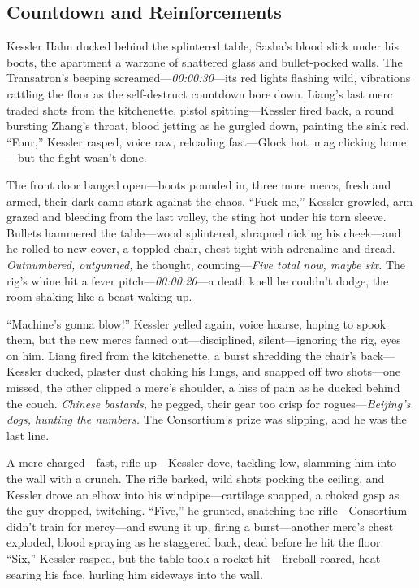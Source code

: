 \documentclass[12pt]{book}
\begin{document}
\subsection{Countdown and Reinforcements}

Kessler Hahn ducked behind the splintered table, Sasha’s blood slick under his boots, the apartment a warzone of shattered glass and bullet-pocked walls. The Transatron’s beeping screamed—\textit{00:00:30}—its red lights flashing wild, vibrations rattling the floor as the self-destruct countdown bore down. Liang’s last merc traded shots from the kitchenette, pistol spitting—Kessler fired back, a round bursting Zhang’s throat, blood jetting as he gurgled down, painting the sink red. “Four,” Kessler rasped, voice raw, reloading fast—Glock hot, mag clicking home—but the fight wasn’t done.

The front door banged open—boots pounded in, three more mercs, fresh and armed, their dark camo stark against the chaos. “Fuck me,” Kessler growled, arm grazed and bleeding from the last volley, the sting hot under his torn sleeve. Bullets hammered the table—wood splintered, shrapnel nicking his cheek—and he rolled to new cover, a toppled chair, chest tight with adrenaline and dread. \textit{Outnumbered, outgunned,} he thought, counting—\textit{Five total now, maybe six.} The rig’s whine hit a fever pitch—\textit{00:00:20}—a death knell he couldn’t dodge, the room shaking like a beast waking up.

“Machine’s gonna blow!” Kessler yelled again, voice hoarse, hoping to spook them, but the new mercs fanned out—disciplined, silent—ignoring the rig, eyes on him. Liang fired from the kitchenette, a burst shredding the chair’s back—Kessler ducked, plaster dust choking his lungs, and snapped off two shots—one missed, the other clipped a merc’s shoulder, a hiss of pain as he ducked behind the couch. \textit{Chinese bastards,} he pegged, their gear too crisp for rogues—\textit{Beijing’s dogs, hunting the numbers.} The Consortium’s prize was slipping, and he was the last line.

A merc charged—fast, rifle up—Kessler dove, tackling low, slamming him into the wall with a crunch. The rifle barked, wild shots pocking the ceiling, and Kessler drove an elbow into his windpipe—cartilage snapped, a choked gasp as the guy dropped, twitching. “Five,” he grunted, snatching the rifle—Consortium didn’t train for mercy—and swung it up, firing a burst—another merc’s chest exploded, blood spraying as he staggered back, dead before he hit the floor. “Six,” Kessler rasped, but the table took a rocket hit—fireball roared, heat searing his face, hurling him sideways into the wall.
\end{document}
